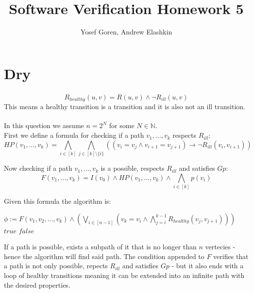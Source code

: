 \documentclass{article}
\begin{document}
\author{Yosef Goren, Andrew Elashkin}
\title{Software Verification Homework 5}
\maketitle
\part{Dry}
\section{}
\subsection{}
\[
    R_{healthy}(u,v)=R(u,v)\wedge \neg R_{ill}(u,v)    
\]
This means a healthy transition is a transition
and it is also not an ill transition.

\subsection{}
In this question we assume $n=2^N$ for some $N\in\mathbb{N}$.\\
First we define a formula
for checking if a path $v_1,...,v_k$
respects $R_{ill}$:
\[
    HP(v_1,...,v_k)=\bigwedge_{i\in[k]}\bigwedge_{j\in[k]\setminus\{i\}}
        \left((v_i=v_j\wedge v_{i+1}=v_{j+1})\rightarrow \neg R_{ill}(v_i,v_{i+1})\right)
\]

Now checking if a path $v_1,...,v_k$
is a possible, respects $R_{ill}$
and satisfies $Gp$:\\
\[
    F(v_1,...,v_k)
    =I(v_0)\wedge HP(v_1,...,v_k)\wedge \bigwedge_{i\in[k]}p(v_i)
\]

Given this formula the algorithm is:
\begin{algorithmic}
        \State $\phi:=F(v_1,v_2,...,v_k)\wedge\left(\bigvee_{i\in[n-1]}\left(v_k=v_i\wedge\bigwedge_{j=i}^{k-1}R_{healthy}(v_j,v_{j+1})\right)\right)$
            \State \Return $true$
        \EndIf
    \EndFor
    \State \Return $false$
\end{algorithmic}
If a path is possible, exists
a subpath of it that is no longer than $n$
vertecies - hence the algorithm will find
said path.
The condition appended to $F$ verifies 
that a path is not only
possible, repects $R_{ill}$ and satisfies $Gp$ -
but it also ends with a loop of healthy transitions
meaning it can be extended into an infinite
path with the desired properties.
\end{document}
